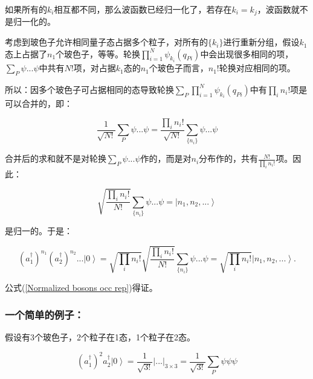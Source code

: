 如果所有的$k_i$相互都不同，那么波函数已经归一化了，若存在$k_i =
k_j$，波函数就不是归一化的。


考虑到玻色子允许相同量子态占据多个粒子，对所有的$\{k_i\}$进行重新分组，假设$k_1$态上占据了$n_1$个玻色子，等等。轮换$\prod\limits_{i
= 1}^N {\psi _{k_i } (q_{Pi} )}$中会出现很多相同的项，$\sum\limits_P
\psi ... \psi$中共有$N!$项，对占据$k_1$态的$n_1$个玻色子而言，$n_1
!$轮换对应相同的项。

所以：因多个玻色子可占据相同的态导致轮换$\sum\limits_P
\prod\limits_{i = 1}^N {\psi _{k_i } (q_{Pi} )}$中有$\prod\limits_i
{n_i !}$项是可以合并的，即：

\begin{equation*}
\frac{1}{{\sqrt {N!} }}\sum\limits_P {\psi ...\psi }  =
\frac{{\mathop \prod \limits_i n_i !}}{{\sqrt {N!} }}\sum\limits_{\{n_i \} } {\psi ...\psi }
\end{equation*}


合并后的求和就不是对轮换$\sum\limits_P \psi ...
\psi$作的，而是对$n_i$分布作的，共有$\frac{{N!}}{{\prod\limits_i {n_i !} }}$项。因此：

\begin{equation*}
\sqrt{ \frac{\prod\limits_i {n_i !}}{N!} }  \sum\limits_{\{n_i \} } {\psi ...\psi } =  \left| n_1, n_2, ...\right\rangle
\end{equation*}

是归一的。于是：

\begin{equation*}
(a_1^{\dagger})^{n_1}(a_2^{\dagger})^{n_2}...\left| 0 \right\rangle
= \sqrt {\mathop \prod \limits_i n_i !} \sqrt {\frac{{\mathop \prod
\limits_i n_i !}}{{N!}}} \sum\limits_{\{ n_i \} } {\psi ...\psi }  =
\sqrt {\mathop \prod \limits_i n_i !} \left| {n_1 ,n_2 ,...}
\right\rangle .
\end{equation*}

公式(\ref{Normalized bosons occ rep})得证。


\subsubsection*{一个简单的例子：}

假设有3个玻色子，2个粒子在1态，1个粒子在2态。

\begin{equation*}
\left( {a_1^\dag  } \right)^2 a_2^\dag  \left| 0 \right\rangle  =
\frac{1} {{\sqrt {3!} }}\left| {...} \right|_{3 \times 3}  =
\frac{1} {{\sqrt {3!} }}\sum\limits_P {\psi \psi \psi }
\end{equation*}


